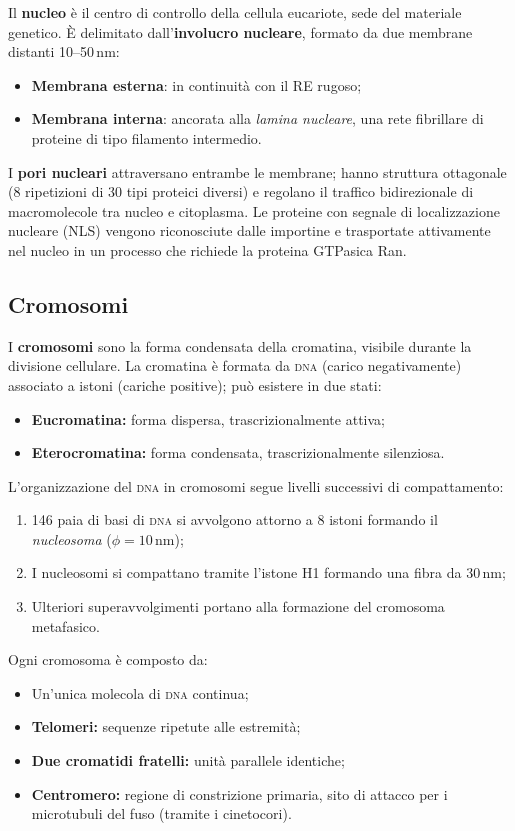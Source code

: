 \documentclass[11pt,a4paper,openright,twoside]{book}
\theoremstyle{definition}
\theoremstyle{plain}
\theoremstyle{remark}
\newcommand{\dna}{\textsc{dna}}
\begin{document}
Il \textbf{nucleo} è il centro di controllo della cellula eucariote, sede del materiale genetico. È delimitato dall'\textbf{involucro nucleare}, formato da due membrane distanti 10--50\,nm:
\begin{itemize}
  \item \textbf{Membrana esterna}: in continuità con il RE rugoso;
  \item \textbf{Membrana interna}: ancorata alla \textit{lamina nucleare}, una rete fibrillare di proteine di tipo filamento intermedio.
\end{itemize}

I \textbf{pori nucleari} attraversano entrambe le membrane; hanno struttura ottagonale (8 ripetizioni di 30 tipi proteici diversi) e regolano il traffico bidirezionale di macromolecole tra nucleo e citoplasma. Le proteine con segnale di localizzazione nucleare (NLS) vengono riconosciute dalle importine e trasportate attivamente nel nucleo in un processo che richiede la proteina GTPasica Ran.

\subsection{Cromosomi}

I \textbf{cromosomi} sono la forma condensata della cromatina, visibile durante la divisione cellulare. La cromatina è formata da \dna{} (carico negativamente) associato a istoni (cariche positive); può esistere in due stati:
\begin{itemize}
  \item \textbf{Eucromatina:} forma dispersa, trascrizionalmente attiva;
  \item \textbf{Eterocromatina:} forma condensata, trascrizionalmente silenziosa.
\end{itemize}

L'organizzazione del \dna{} in cromosomi segue livelli successivi di compattamento:
\begin{enumerate}
  \item 146 paia di basi di \dna{} si avvolgono attorno a 8 istoni formando il \textit{nucleosoma} ($\phi = 10$\,nm);
  \item I nucleosomi si compattano tramite l'istone H1 formando una fibra da 30\,nm;
  \item Ulteriori superavvolgimenti portano alla formazione del cromosoma metafasico.
\end{enumerate}

Ogni cromosoma è composto da:
\begin{itemize}
  \item Un'unica molecola di \dna{} continua;
  \item \textbf{Telomeri:} sequenze ripetute alle estremità;
  \item \textbf{Due cromatidi fratelli:} unità parallele identiche;
  \item \textbf{Centromero:} regione di constrizione primaria, sito di attacco per i microtubuli del fuso (tramite i cinetocori).
\end{itemize}
\end{document}
